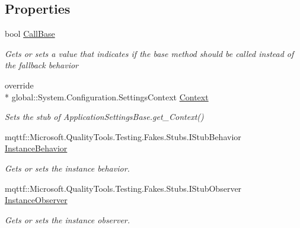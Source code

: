 \subsection*{Properties}
\begin{DoxyCompactItemize}
\item 
bool \hyperlink{class_system_1_1_configuration_1_1_fakes_1_1_stub_application_settings_base_a63a7070744f36adc490666a68a44f1ba}{Call\-Base}
\begin{DoxyCompactList}\small\item\em Gets or sets a value that indicates if the base method should be called instead of the fallback behavior\end{DoxyCompactList}\item 
override \\*
global\-::\-System.\-Configuration.\-Settings\-Context \hyperlink{class_system_1_1_configuration_1_1_fakes_1_1_stub_application_settings_base_a2abae2546494246fe2a72efd1334556c}{Context}
\begin{DoxyCompactList}\small\item\em Sets the stub of Application\-Settings\-Base.\-get\-\_\-\-Context()\end{DoxyCompactList}\item 
mqttf\-::\-Microsoft.\-Quality\-Tools.\-Testing.\-Fakes.\-Stubs.\-I\-Stub\-Behavior \hyperlink{class_system_1_1_configuration_1_1_fakes_1_1_stub_application_settings_base_ab0a73be310eec7ddf2258b377d6982c9}{Instance\-Behavior}
\begin{DoxyCompactList}\small\item\em Gets or sets the instance behavior.\end{DoxyCompactList}\item 
mqttf\-::\-Microsoft.\-Quality\-Tools.\-Testing.\-Fakes.\-Stubs.\-I\-Stub\-Observer \hyperlink{class_system_1_1_configuration_1_1_fakes_1_1_stub_application_settings_base_a13a5d99456d412a0e4703ef3f03e4524}{Instance\-Observer}
\begin{DoxyCompactList}\small\item\em Gets or sets the instance observer.\end{DoxyCompactList}\item 

\end{DoxyCompactItemize}
